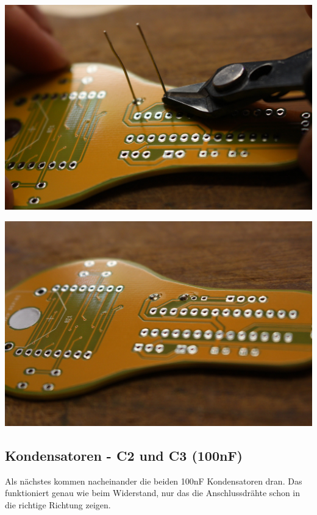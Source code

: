 \documentclass{article}
\begin{document}
\begin{minipage}[b]{0.5\textwidth}
	\includegraphics[width=\textwidth]{Bilder/IMG_5544.JPG}
\end{minipage}
\begin{minipage}[b]{0.5\textwidth}
	\includegraphics[width=\textwidth]{Bilder/IMG_5545.JPG}
\end{minipage}

\subsection{Kondensatoren - C2 und C3 (100nF)}

Als nächstes kommen nacheinander die beiden 100nF Kondensatoren dran.
Das funktioniert genau wie beim Widerstand, nur das die Anschlussdrähte schon in die richtige Richtung zeigen.
\end{document}
